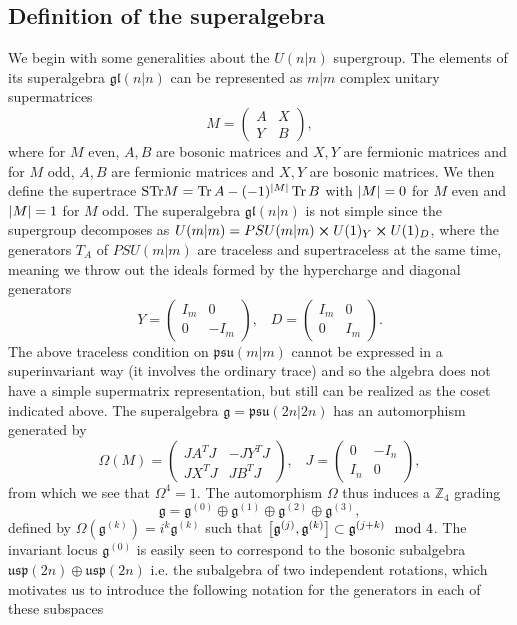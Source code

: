 \documentclass[12pt]{article}
\def\be{\begin{equation}}
\def\ee{\end{equation}}
\numberwithin{equation}{section}
\begin{document}
\subsection{Definition of the superalgebra}
We begin with some generalities about the $U(n|n)$ supergroup. The elements  of its superalgebra $\mathfrak{gl}(n|n)$ can be represented as $m|m$ complex unitary supermatrices
\be
M= \begin{pmatrix}
    A & X\\
    Y & B
  \end{pmatrix},
\ee
where for $M$ even, $A,B$ are bosonic matrices and $X, Y$ are fermionic matrices and for $M$ odd, $A,B$ are fermionic matrices and $X,Y$ are bosonic matrices. We then define the supertrace $\text{STr} M = \Tr A - (-1)^{\abs{M}} \Tr B$ with $\abs{M} = 0$ for $M$ even and $\abs{M} = 1$ for $M$ odd. The superalgebra $\mathfrak{gl}(n|n)$ is not simple since the supergroup decomposes as $U(m|m) = PSU(m|m) \cross U(1)_Y \cross U(1)_D$, where the generators $T_A$ of $PSU(m|m)$ are traceless and supertraceless at the same time, meaning we throw out the ideals formed by the hypercharge and diagonal generators
\be
Y = \begin{pmatrix}
	I_m & 0 \\
	0 & -I_m
\end{pmatrix}, \,\,\,\,\, D = \begin{pmatrix}
	I_m & 0 \\
	0 & I_m
\end{pmatrix}.
\ee
The above traceless condition on $\mathfrak{psu}(m|m)$ cannot be expressed in a superinvariant way (it involves the ordinary trace) and so the algebra does not have a simple supermatrix representation, but still can be realized as the coset indicated above. The superalgebra $\mathfrak{g} = \mathfrak{psu}(2n|2n)$ has an automorphism generated by
\be
\Omega(M) = \begin{pmatrix}
	J A^T J & -J Y^T J \\
	J X^T J & J B^T J
	\end{pmatrix}, \,\,\,\,\, J = \begin{pmatrix}
	0 & -I_n \\
	I_n & 0
\end{pmatrix},
\ee
from which we see that $\Omega^4 = 1$.
The automorphism $\Omega$ thus induces a $\mathbb{Z}_4$ grading
\be
\mathfrak{g} = \mathfrak{g}^{(0)} \oplus \mathfrak{g}^{(1)} \oplus \mathfrak{g}^{(2)} \oplus \mathfrak{g}^{(3)},
\ee
defined by $\Omega(\mathfrak{g}^{(k)}) = i^k \mathfrak{g}^{(k)}$ such that $\comm{\mathfrak{g}^{(j)}}{\mathfrak{g}^{(k)}} \subset \mathfrak{g}^{(j+k)} \mod 4 $. The invariant locus $\mathfrak{g}^{(0)}$ is easily seen to correspond to the bosonic subalgebra $\mathfrak{usp}(2n) \oplus \mathfrak{usp}(2n)$ i.e. the subalgebra of two independent rotations, which motivates us to introduce the following notation for the generators in each of these subspaces
\end{document}
